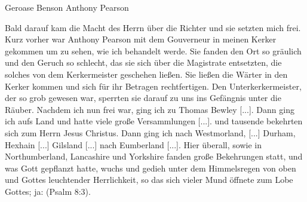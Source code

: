 {\begin{flushright}
Geroase Benson
Anthony Pearson
\end{flushright}
}


Bald darauf kam die Macht des Herrn über die Richter
und sie setzten mich frei. Kurz vorher war Anthony Pearson
mit dem Gouverneur in meinen Kerker gekommen um zu sehen,
wie ich behandelt werde. Sie fanden den Ort so gräulich und
den Geruch so schlecht, das sie sich über die Magistrate entsetzten,
die solches von dem Kerkermeister geschehen ließen. Sie ließen
die Wärter in den Kerker kommen und sich für ihr Betragen
rechtfertigen. Den Unterkerkermeister, der so grob gewesen war,
sperrten sie darauf zu uns ins Gefängnis unter die Räuber.
Nachdem ich nun frei war, ging ich zu Thomas 
Bewley [...].
Dann ging ich aufs Land und hatte viele große Versammlungen [...].
und tausende bekehrten sich zum Herrn Jesus Christus.
Dann ging ich nach Westmorland, [...] Durham, Hexhain [...]
Gilsland [...] nach Eumberland [...]. Hier überall, sowie in
Northumberland, Lancashire und Yorkshire fanden große Bekehrungen 
statt, und was Gott gepflanzt hatte, wuchs und gedieh
unter dem Himmelsregen von oben und Gottes leuchtender 
Herrlichkeit, so das sich vieler Mund öffnete zum Lobe Gottes; 
ja:  
(Psalm 8:3).
